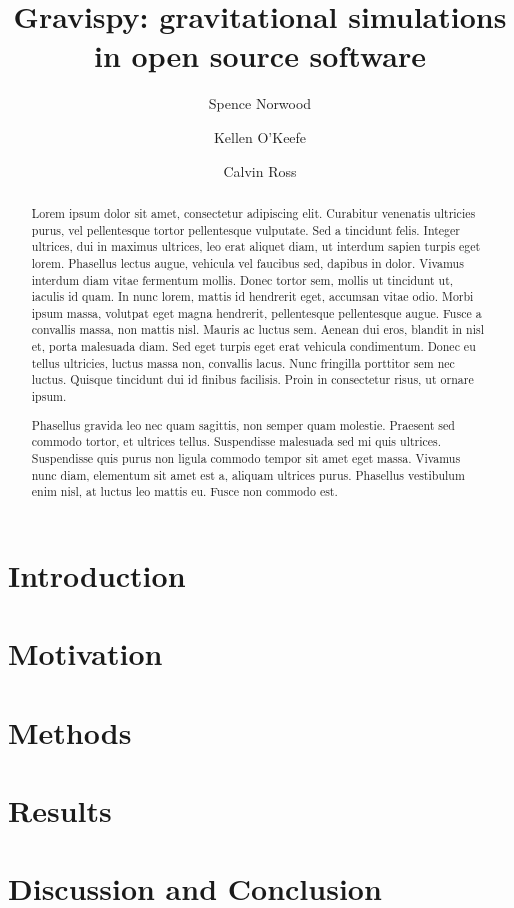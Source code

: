 \documentclass[
aps,prd,
preprint,
onecolumn,
12pt,
amsmath, amssymb,
secnumarabic,
]{revtex4-1}
\begin{document}
\title{Gravispy: gravitational simulations in open source software}
\author{Spence Norwood}
\author{Kellen O'Keefe}
\author{Calvin Ross}
\begin{abstract}
  Lorem ipsum dolor sit amet, consectetur adipiscing elit.
  Curabitur venenatis ultricies purus, vel pellentesque tortor pellentesque vulputate.
  Sed a tincidunt felis.
  Integer ultrices, dui in maximus ultrices, leo erat aliquet diam, ut interdum sapien turpis eget lorem.
  Phasellus lectus augue, vehicula vel faucibus sed, dapibus in dolor.
  Vivamus interdum diam vitae fermentum mollis.
  Donec tortor sem, mollis ut tincidunt ut, iaculis id quam.
  In nunc lorem, mattis id hendrerit eget, accumsan vitae odio.
  Morbi ipsum massa, volutpat eget magna hendrerit, pellentesque pellentesque augue.
  Fusce a convallis massa, non mattis nisl.
  Mauris ac luctus sem.
  Aenean dui eros, blandit in nisl et, porta malesuada diam.
  Sed eget turpis eget erat vehicula condimentum.
  Donec eu tellus ultricies, luctus massa non, convallis lacus.
  Nunc fringilla porttitor sem nec luctus.
  Quisque tincidunt dui id finibus facilisis.
  Proin in consectetur risus, ut ornare ipsum.

  Phasellus gravida leo nec quam sagittis, non semper quam molestie.
  Praesent sed commodo tortor, et ultrices tellus.
  Suspendisse malesuada sed mi quis ultrices.
  Suspendisse quis purus non ligula commodo tempor sit amet eget massa.
  Vivamus nunc diam, elementum sit amet est a, aliquam ultrices purus.
  Phasellus vestibulum enim nisl, at luctus leo mattis eu. Fusce non commodo est.
\end{abstract}
\maketitle

\section{Introduction\label{sec:intro}}


\section{Motivation\label{sec:motive}}


\section{Methods\label{sec:method}}


\section{Results\label{sec:results}}


\section{Discussion and Conclusion}


\nocite{*}

\end{document}
